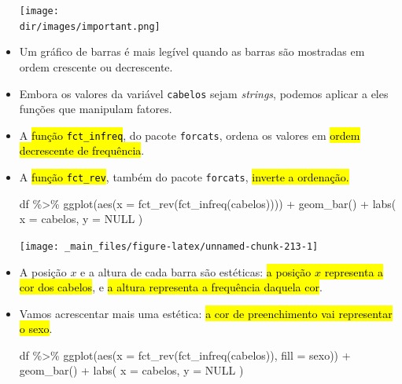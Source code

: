 \documentclass[
  11pt]{report}
\newenvironment{Shaded}{\begin{snugshade}}{\end{snugshade}}
\newcommand{\AttributeTok}[1]{\textcolor[rgb]{0.77,0.63,0.00}{#1}}
\newcommand{\ConstantTok}[1]{\textcolor[rgb]{0.00,0.00,0.00}{#1}}
\newcommand{\FunctionTok}[1]{\textcolor[rgb]{0.00,0.00,0.00}{#1}}
\newcommand{\NormalTok}[1]{#1}
\newcommand{\SpecialCharTok}[1]{\textcolor[rgb]{0.00,0.00,0.00}{#1}}
\newcommand{\StringTok}[1]{\textcolor[rgb]{0.31,0.60,0.02}{#1}}
\newcommand{\dir}{/ssd/R/x86_64-pc-linux-gnu-library/4.2/fnaufelRmd/rmarkdown/resources}
\newenvironment{rmdimportant}
{
  \begin{myimportant}
    \texttt{[image: \\dir/images/important.png]}
    \tcblower
  }
  {
  \end{myimportant}
}
\renewenvironment{Shaded}{
    \begin{mdframed}[%
      roundcorner=2pt,%
      innerleftmargin=5pt,%
      innerrightmargin=5pt,%
      topline=true,%
      leftline=true,%
      rightline=true,%
      bottomline=true,%
      linewidth=0.5pt,%
      linecolor=black!20,%
      backgroundcolor=black!2,%
      skipabove=2ex,%
      skipbelow=2.5ex%
    ]%
  }
  {
    \end{mdframed}
  }
\begin{document}
\begin{itemize}
\begin{rmdimportant}
  \end{rmdimportant}
\item
  Um gráfico de barras é mais legível quando as barras são mostradas em ordem crescente ou decrescente.
\item
  Embora os valores da variável \texttt{cabelos} sejam \emph{strings}, podemos aplicar a eles funções que manipulam fatores.
\item
  A {\hl{função {\mbox{\texttt{fct\_infreq}}}}}, do pacote \texttt{forcats}, ordena os valores em {\hl{ordem decrescente de frequência}}.
\item
  A {\hl{função {\mbox{\texttt{fct\_rev}}}}}, também do pacote \texttt{forcats}, {\hl{inverte a ordenação.}}

\begin{Shaded}
\begin{Highlighting}[]
\NormalTok{df }\SpecialCharTok{\%\textgreater{}\%} 
  \FunctionTok{ggplot}\NormalTok{(}\FunctionTok{aes}\NormalTok{(}\AttributeTok{x =} \FunctionTok{fct\_rev}\NormalTok{(}\FunctionTok{fct\_infreq}\NormalTok{(cabelos)))) }\SpecialCharTok{+}
    \FunctionTok{geom\_bar}\NormalTok{() }\SpecialCharTok{+}
    \FunctionTok{labs}\NormalTok{(}
      \AttributeTok{x =} \StringTok{\textquotesingle{}cabelos\textquotesingle{}}\NormalTok{,}
      \AttributeTok{y =} \ConstantTok{NULL}
\NormalTok{    )}
\end{Highlighting}
\end{Shaded}

  \begin{center}\texttt{[image: \_main\_files/figure-latex/unnamed-chunk-213-1]} \end{center}
\item
  A posição $x$ e a altura de cada barra são estéticas: {\hl{a posição $x$ representa a cor dos cabelos}}, e {\hl{a altura representa a frequência daquela cor}}.
\item
  Vamos acrescentar mais uma estética: {\hl{a cor de preenchimento vai representar o sexo}}.

\begin{Shaded}
\begin{Highlighting}[]
\NormalTok{df }\SpecialCharTok{\%\textgreater{}\%} 
  \FunctionTok{ggplot}\NormalTok{(}\FunctionTok{aes}\NormalTok{(}\AttributeTok{x =} \FunctionTok{fct\_rev}\NormalTok{(}\FunctionTok{fct\_infreq}\NormalTok{(cabelos)), }\AttributeTok{fill =}\NormalTok{ sexo)) }\SpecialCharTok{+}
    \FunctionTok{geom\_bar}\NormalTok{() }\SpecialCharTok{+}
    \FunctionTok{labs}\NormalTok{(}
      \AttributeTok{x =} \StringTok{\textquotesingle{}cabelos\textquotesingle{}}\NormalTok{,}
      \AttributeTok{y =} \ConstantTok{NULL}
\NormalTok{    )}
\end{Highlighting}
\end{Shaded}


\end{itemize}
\end{document}
